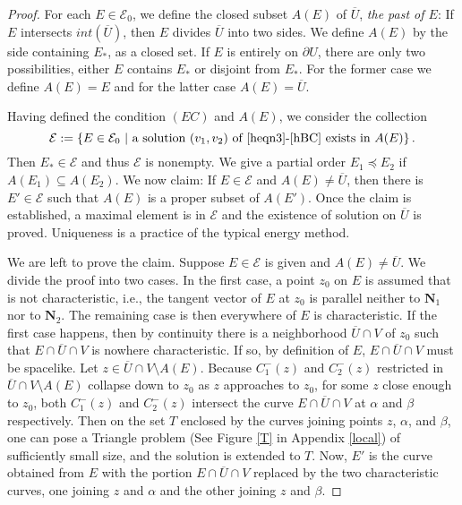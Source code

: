 \documentclass[11pt]{amsart}
\theoremstyle{plain}
\theoremstyle{remark}
\numberwithin{equation}{section}
\numberwithin{Thm}{section}
\def\U{\overline{U}}
\def\N{{\mathbf N}}
\begin{document}
\begin{proof}
For each $E\in\mathcal{E}_0$, we define the closed subset $A(E)$ of $\U$, {\it the past of $E$}: If $E$ intersects $int(\U)$, then $E$ divides $\U$ into two sides. We define $A(E)$ by the side containing $E_*$, as a closed set. If $E$ is entirely on $\partial U$, there are only two possibilities, either $E$ contains $E_*$ or disjoint from $E_*$. For the former case we define $A(E)=E$ and for the latter case $A(E)=\U$. 

Having defined the condition $(EC)$ and $A(E)$, we consider the collection
$$\mathcal{E}:=\left\{ E \in \mathcal{E}_0 ~|~ \text{a solution $(v_1,v_2)$ of \eqref{heqn3}-\eqref{hBC} exists in $A(E)$} \right\}.$$ 
Then $E_* \in \mathcal{E}$ and thus $\mathcal{E}$ is nonempty. We give a partial order $E_1 \preceq E_2$ if $A(E_1)\subseteq A(E_2)$. We now claim: If $E\in \mathcal{E}$ and $A(E)\ne \U$, then there is $E'\in \mathcal{E}$ such that $A(E)$ is a proper subset of $A(E')$. Once the claim is established, a maximal element is in $\mathcal{E}$ and the existence of solution on $\U$ is proved. Uniqueness is a practice of the typical energy method. 

We are left to prove the claim. Suppose $E \in \mathcal{E}$ is given and $A(E)\ne \U$. We divide the proof into two cases. In the first case, a point $z_0$ on $E$ is assumed that is not characteristic, i.e., the tangent vector of $E$ at $z_0$ is parallel neither to $\N_1$ nor to $\N_2$. The remaining case is then everywhere of $E$ is characteristic. If the first case happens, then by continuity there is a neighborhood $\U\cap V$ of $z_0$ such that $E\cap \U \cap V$ is nowhere characteristic. If so, by definition of $E$, $E\cap \U \cap V$ must be spacelike. Let $z \in \U \cap V \setminus A(E)$. Because $C^-_1(z)$ and $C^-_2(z)$ restricted in $\U \cap V \setminus A(E)$ collapse down to $z_0$  as $z$ approaches to $z_0$, for some $z$ close enough to $z_0$, both $C^-_1(z)$ and $C^-_2(z)$ intersect the curve $E\cap \U \cap V$ at $\alpha$ and $\beta$ respectively. Then on the set $T$ enclosed by the curves joining points $z$, $\alpha$, and $\beta$, one can pose a Triangle problem (See Figure \ref{T} in Appendix \ref{local}) of sufficiently small size, and the solution is extended to $T$. Now, $E'$ is the curve obtained from $E$ with the portion $E\cap \U \cap V$ replaced by the two characteristic curves, one joining $z$ and $\alpha$ and the other joining $z$ and $\beta$.


\end{proof}
\end{document}
